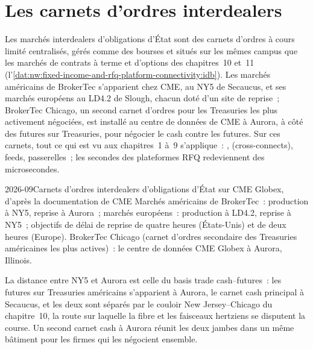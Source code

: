 \section{Les carnets d'ordres interdealers}

Les marchés interdealers d'obligations d'État sont des carnets d'ordres à cours limité centralisés, gérés comme des bourses et situés sur les mêmes campus que
les marchés de contrats à terme et d'options des chapitres~10 et~11 (l'\cref{dat:nw:fixed-income-and-rfq-platform-connectivity:idb}). Les marchés américains de BrokerTec
s'apparient chez CME, au NY5 de Secaucus, et ses marchés européens au LD4.2 de Slough, chacun doté d'un site de reprise~; BrokerTec Chicago, un
second carnet d'ordres pour les Treasuries les plus activement négociées, est installé au centre de données de CME à Aurora, à côté des futures sur Treasuries, pour négocier le cash
contre les futures. Sur ces carnets, tout ce qui est vu aux chapitres~1 à~9 s'applique~: ,  (cross-connects), feeds, passerelles~; les
secondes des plateformes RFQ redeviennent des microsecondes.

\begin{dated}{2026-09}{Carnets d'ordres interdealers d'obligations d'État sur CME Globex, d'après la documentation de CME}\label{dat:nw:fixed-income-and-rfq-platform-connectivity:idb}
Marchés américains de BrokerTec~: production à NY5, reprise à Aurora~; marchés européens~: production à LD4.2, reprise à NY5~; objectifs de délai de reprise
de quatre heures (États-Unis) et de deux heures (Europe). BrokerTec Chicago (carnet d'ordres secondaire des Treasuries américaines les plus actives)~: le centre de données CME Globex à
Aurora, Illinois.
\end{dated}

La distance entre NY5 et Aurora est celle du basis trade cash--futures~: les futures sur Treasuries américains s'apparient à Aurora, le
carnet cash principal à Secaucus, et les deux sont séparés par le couloir New Jersey--Chicago du chapitre~10, la route sur laquelle la fibre et les faisceaux hertziens
se disputent la course. Un second carnet cash à Aurora réunit les deux jambes dans un même bâtiment pour les firmes qui les négocient ensemble.

